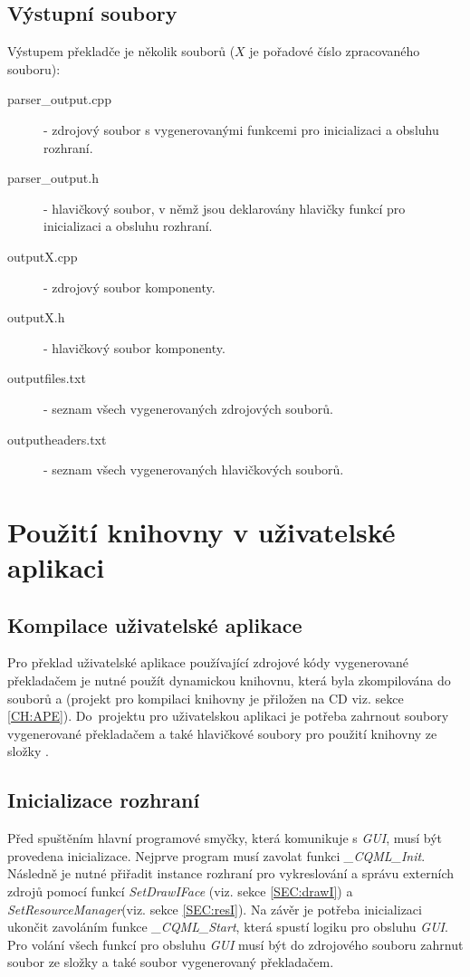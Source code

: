 \documentclass[11pt,twoside,a4paper]{book}
\begin{document}
\subsection{Výstupní soubory}
Výstupem překladče je několik souborů ($X$ je pořadové číslo zpracovaného souboru):
\begin{description}
\item[parser\_output.cpp] - zdrojový soubor s vygenerovanými funkcemi pro inicializaci a obsluhu rozhraní.
\item[parser\_output.h] - hlavičkový soubor, v němž jsou deklarovány hlavičky funkcí pro inicializaci a obsluhu rozhraní.
\item[outputX.cpp] - zdrojový soubor komponenty.
\item[outputX.h] - hlavičkový soubor komponenty.
\item[outputfiles.txt] - seznam všech vygenerovaných zdrojových souborů.
\item[outputheaders.txt] - seznam všech vygenerovaných hlavičkových souborů.
\end{description}
\section[Použití knihovny]{Použití knihovny v uživatelské aplikaci}
\subsection{Kompilace uživatelské aplikace}
Pro překlad uživatelské aplikace používající zdrojové kódy vygenerované překladačem je nutné použít dynamickou knihovnu, která byla zkompilována do souborů  a  (projekt pro kompilaci knihovny je přiložen na CD viz. sekce \ref{CH:APE}). Do~projektu pro uživatelskou aplikaci je potřeba zahrnout soubory vygenerované překladačem a také hlavičkové soubory pro použití knihovny ze složky .
\subsection{Inicializace rozhraní}
Před spuštěním hlavní programové smyčky, která komunikuje s \textit{GUI}, musí být provedena inicializace. Nejprve program musí zavolat funkci \textit{\_CQML\_Init}. Následně je nutné přiřadit instance rozhraní pro vykreslování a správu externích zdrojů pomocí funkcí \textit{SetDrawIFace} (viz. sekce \ref{SEC:drawI}) a \textit{SetResourceManager}(viz. sekce \ref{SEC:resI}). Na závěr je potřeba inicializaci ukončit zavoláním funkce \textit{\_CQML\_Start}, která spustí logiku pro obsluhu \textit{GUI}. Pro volání všech funkcí pro obsluhu \textit{GUI} musí být do zdrojového souboru zahrnut soubor  ze složky  a také soubor  vygenerovaný překladačem.
\end{document}
